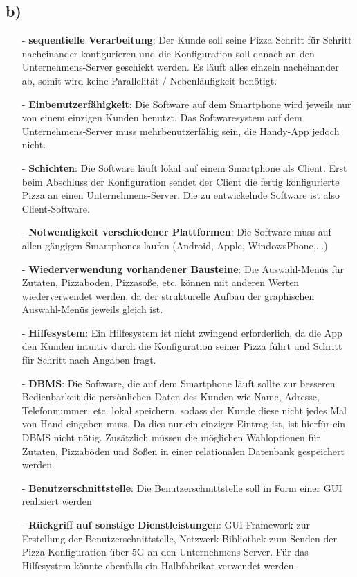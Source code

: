 \subsection*{b)}
\begin{itemize}
\item[-] \textbf{sequentielle Verarbeitung}: Der Kunde soll seine Pizza Schritt für Schritt nacheinander konfigurieren und die Konfiguration soll danach an den Unternehmens-Server geschickt werden. Es läuft alles einzeln nacheinander ab, somit wird keine Parallelität / Nebenläufigkeit benötigt.\\
\item[-] \textbf{Einbenutzerfähigkeit}: Die Software auf dem Smartphone wird jeweils nur von einem einzigen Kunden benutzt. Das Softwaresystem auf dem Unternehmens-Server muss mehrbenutzerfähig sein, die Handy-App jedoch nicht.\\
\item[-] \textbf{Schichten}: Die Software läuft lokal auf einem Smartphone als Client. Erst beim Abschluss der Konfiguration sendet der Client die fertig konfigurierte Pizza an einen Unternehmens-Server. Die zu entwickelnde Software ist also Client-Software.
\item[-] \textbf{Notwendigkeit verschiedener Plattformen}: Die Software muss auf allen gängigen Smartphones laufen (Android, Apple, WindowsPhone,...)
\item[-] \textbf{Wiederverwendung vorhandener Bausteine}:   Die Auswahl-Menüs für Zutaten, Pizzaboden, Pizzasoße, etc. können mit anderen Werten wiederverwendet werden, da der strukturelle Aufbau der graphischen Auswahl-Menüs jeweils gleich ist.
\item[-] \textbf{Hilfesystem}: Ein Hilfesystem ist nicht zwingend erforderlich, da die App den Kunden intuitiv durch die Konfiguration seiner Pizza führt und Schritt für Schritt nach Angaben fragt.\\
\item[-] \textbf{DBMS}: Die Software, die auf dem Smartphone läuft sollte zur besseren Bedienbarkeit die persönlichen Daten des Kunden wie Name, Adresse, Telefonnummer, etc. lokal speichern, sodass der Kunde diese nicht jedes Mal von Hand eingeben muss. Da dies nur ein einziger Eintrag ist, ist hierfür ein DBMS nicht nötig. Zusätzlich müssen die möglichen Wahloptionen für Zutaten, Pizzaböden und Soßen in einer relationalen Datenbank gespeichert werden.\\
\item[-] \textbf{Benutzerschnittstelle}: Die Benutzerschnittstelle soll in Form einer GUI realisiert werden
\item[-] \textbf{Rückgriff auf sonstige Dienstleistungen}: GUI-Framework zur Erstellung der Benutzerschnittstelle, Netzwerk-Bibliothek zum Senden der Pizza-Konfiguration über 5G an den Unternehmens-Server. Für das Hilfesystem könnte ebenfalls ein Halbfabrikat verwendet werden.
\end{itemize}
\newpage
